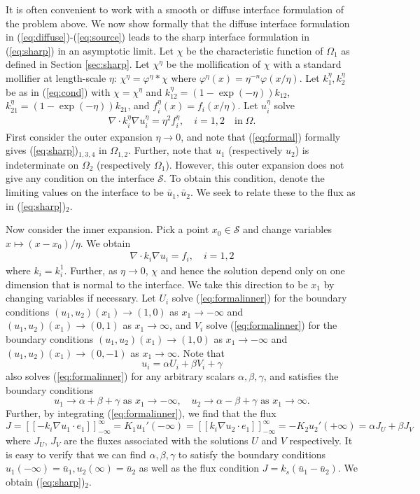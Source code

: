 \documentclass[11pt]{article}
\begin{document}
It is often convenient to work with a smooth or diffuse interface formulation of the problem above.  We now show formally that the diffuse interface formulation in (\ref{eq:diffuse})-(\ref{eq:source}) leads to the sharp interface formulation in (\ref{eq:sharp}) in an asymptotic limit.  Let $\chi$ be the characteristic function of $\Omega_1$ as defined in Section \ref{sec:sharp}.  Let $\chi^\eta$ be the mollification of $\chi$ with a standard mollifier at length-scale $\eta$: $\chi^\eta = \varphi^\eta * \chi$ where $\varphi^\eta (x) = \eta^{-n} \varphi(x/\eta)$.  Let $k_1^\eta, k_2^\eta$ be as in (\ref{eq:cond}) with $\chi = \chi^\eta$ and $k_{12}^\eta = (1-\exp(-\eta)) k_{12}$, $k_{21}^\eta = (1-\exp(-\eta)) k_{21}$, and  $f_i^\eta (x) = f_i(x/\eta)$.  Let $u_i^\eta$ solve
\begin{align} \label{eq:formal}
\nabla\cdot k_i^\eta \nabla u_i^\eta = \eta^2 f_i^\eta , \quad i = 1,2 \quad \text{in}\;\Omega.
\end{align}
First consider the outer expansion $\eta \to 0$, and note that (\ref{eq:formal}) formally gives (\ref{eq:sharp})$_{1,3,4}$ in $\Omega_{1,2}$.  Further, note that $u_1$ (respectively $u_2$) is indeterminate on $\Omega_2$ (respectively $\Omega_1$).  However, this outer expansion does not give any condition on the interface $\mathcal{S}$. To obtain this condition, denote the limiting values on the interface to be $\bar{u}_1, \bar{u}_2$.  We seek to relate these to the flux as in (\ref{eq:sharp})$_{2}$.  

Now consider the inner expansion.  Pick a point $x_0 \in {\mathcal S}$ and change variables $x \mapsto (x-x_0)/\eta$.  We obtain 
\begin{align} \label{eq:formalinner}
\nabla\cdot k_i \nabla u_i =  f_i , \quad i = 1,2
\end{align}
where $k_i = k_i^1$.  Further, as $\eta \to 0$, $\chi$ and hence the solution depend only on one dimension that is normal to the interface.  We take this direction to be $x_1$ by changing variables if necessary.  Let $U_i$ solve (\ref{eq:formalinner}) for the boundary conditions $(u_1, u_2) (x_1) \to (1,0)$ as $x_1 \to -\infty$ and $(u_1, u_2) (x_1) \to (0,1)$ as $x_1 \to \infty$, and $V_i$ solve (\ref{eq:formalinner}) for the boundary conditions $(u_1, u_2) (x_1) \to (1,0)$ as $x_1 \to -\infty$ and $(u_1, u_2) (x_1) \to (0,-1)$ as $x_1 \to \infty$.  Note that 
$$
u_i = \alpha U_i + \beta V_i + \gamma
$$
also solves (\ref{eq:formalinner}) for any arbitrary scalars $\alpha, \beta, \gamma$, 
and satisfies the boundary conditions 
$$
u_1 \to \alpha + \beta + \gamma \mbox { as } x_1 \to -\infty, \quad 
u_2 \to \alpha - \beta + \gamma \mbox{ as } x_1 \to \infty.
$$
Further, by integrating (\ref{eq:formalinner}), we find that the flux 
$$
J = [[-k_i \nabla u_1\cdot e_1]]_{-\infty}^{\infty} =  K_1 u_1' (-\infty)
=  [[k_i \nabla u_2\cdot e_1]]_{-\infty}^{\infty} = - K_2 u_2' (+\infty)
= \alpha J_U + \beta J_V
$$
where $J_U$, $J_V$ are the fluxes associated with the solutions $U$ and $V$ respectively.   It is easy to verify that we can find $\alpha, \beta, \gamma$ to satisfy the boundary conditions $u_1 (-\infty) = \bar{u}_1,
u_2 (\infty) = \bar{u}_2$ as well as the flux condition $J = k_s (\bar{u}_1 -\bar{u}_2)$.  We obtain (\ref{eq:sharp})$_2$.
\end{document}
